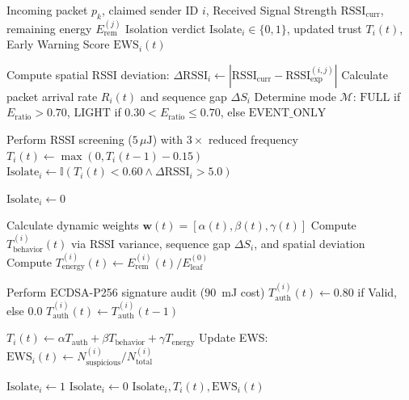 \documentclass[journal]{IEEEtran}
\begin{document}
\begin{algorithm}[htbp]
\caption{Industrial Adaptive Hybrid Event-Driven Spoofing Detection (IAH-EDSD)}
\label{alg_iah_edsd}
\begin{algorithmic}[1]
\REQUIRE Incoming packet $p_k$, claimed sender ID $i$, Received Signal Strength $\text{RSSI}_{\text{curr}}$, remaining energy $E_{\text{rem}}^{(j)}$
\ENSURE Isolation verdict $\text{Isolate}_i \in \{0, 1\}$, updated trust $T_i(t)$, Early Warning Score $\text{EWS}_i(t)$

\STATE Compute spatial RSSI deviation: $\Delta\text{RSSI}_i \leftarrow |\text{RSSI}_{\text{curr}} - \text{RSSI}_{\text{exp}}^{(i, j)}|$
\STATE Calculate packet arrival rate $R_i(t)$ and sequence gap $\Delta S_i$
\STATE Determine mode $\mathcal{M}$: $\text{FULL}$ if $E_{\text{ratio}} > 0.70$, $\text{LIGHT}$ if $0.30 < E_{\text{ratio}} \le 0.70$, else $\text{EVENT\_ONLY}$

    \STATE Perform RSSI screening ($5\,\mu\text{J}$) with $3\times$ reduced frequency
        \STATE $T_i(t) \leftarrow \max(0, T_i(t-1) - 0.15)$
    \ENDIF
    \RETURN $\text{Isolate}_i \leftarrow \mathbb{I}(T_i(t) < 0.60 \land \Delta\text{RSSI}_i > 5.0)$
\ENDIF

    \RETURN $\text{Isolate}_i \leftarrow 0$ 
\ENDIF

\STATE Calculate dynamic weights $\boldsymbol{w}(t) = [\alpha(t), \beta(t), \gamma(t)]$
\STATE Compute $T_{\text{behavior}}^{(i)}(t)$ via RSSI variance, sequence gap $\Delta S_i$, and spatial deviation
\STATE Compute $T_{\text{energy}}^{(i)}(t) \leftarrow E_{\text{rem}}^{(i)}(t) / E_{\text{leaf}}^{(0)}$

    \STATE Perform ECDSA-P256 signature audit ($90$~mJ cost)
    \STATE $T_{\text{auth}}^{(i)}(t) \leftarrow 0.80$ if Valid, else $0.0$
\ELSE
    \STATE $T_{\text{auth}}^{(i)}(t) \leftarrow T_{\text{auth}}^{(i)}(t-1)$
\ENDIF

\STATE $T_i(t) \leftarrow \alpha T_{\text{auth}} + \beta T_{\text{behavior}} + \gamma T_{\text{energy}}$
\STATE Update EWS: $\text{EWS}_i(t) \leftarrow N_{\text{suspicious}}^{(i)} / N_{\text{total}}^{(i)}$

    \STATE $\text{Isolate}_i \leftarrow 1$ 
\ELSE
    \STATE $\text{Isolate}_i \leftarrow 0$
\ENDIF
\RETURN $\text{Isolate}_i, T_i(t), \text{EWS}_i(t)$
\end{algorithmic}
\end{algorithm}
\end{document}
